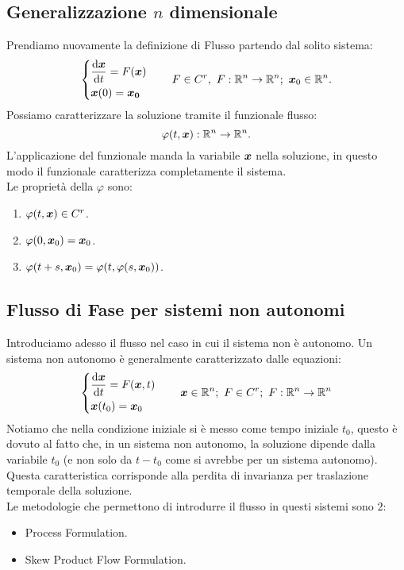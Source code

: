 \subsection{Generalizzazione $n$ dimensionale}%
\label{sub:Generalizzazione $n$ dimensonale}
Prendiamo nuovamente la definizione di Flusso partendo dal solito sistema:
\[
    \begin{dcases}
	\frac{\text{d} \boldsymbol{x}}{\text{d} t} = F(\boldsymbol{x})\\
	\boldsymbol{x} (0)=\boldsymbol{x_0}
    \end{dcases}
    \qquad 
    F \in C^r, \ F:\mathbb{R}^n\to \mathbb{R}^n; \ \boldsymbol{x}_0 \in \mathbb{R}^n
.\] 
Possiamo caratterizzare la soluzione tramite il funzionale flusso:
\[
    \varphi (t,\boldsymbol{x}): \mathbb{R}^n\to \mathbb{R}^n
.\] 
L'applicazione del funzionale manda la variabile $\boldsymbol{x}$ nella soluzione, in questo modo il funzionale caratterizza completamente il sistema.\\
Le proprietà della $\varphi$ sono:
\begin{enumerate}
    \item $\varphi (t, \boldsymbol{x}) \in C^r$.
    \item $\varphi (0, \boldsymbol{x}_0) = \boldsymbol{x}_0$.
    \item $\varphi (t + s, \boldsymbol{x}_0) = \varphi (t, \varphi (s, \boldsymbol{x}_0))$.
\end{enumerate}
\subsection{Flusso di Fase per sistemi non autonomi}%
\label{sub:Flusso di Fase per sistemi non autonomi}
Introduciamo adesso il flusso nel caso in cui il sistema non è autonomo. Un sistema non autonomo è generalmente caratterizzato dalle equazioni:
\[
    \begin{dcases}
	\frac{\text{d} \boldsymbol{x}}{\text{d} t} = F(\boldsymbol{x}, t)\\
	\boldsymbol{x}(t_0) = \boldsymbol{x}_0
    \end{dcases}
    \qquad 
    \boldsymbol{x} \in \mathbb{R}^n; \ F \in C^r; \ F: \mathbb{R}^n\to \mathbb{R}^n
\] 
Notiamo che nella condizione iniziale si è messo come tempo iniziale $t_0$, questo è dovuto al fatto che, in un sistema non autonomo, la soluzione dipende dalla variabile $t_0$ (e non solo da $t-t_0$ come si avrebbe per un sistema autonomo). Questa caratteristica corrisponde alla perdita di invarianza per traslazione temporale della soluzione.\\
Le metodologie che permettono di introdurre il flusso in questi sistemi sono $2$:
\begin{itemize}
    \item Process Formulation.
    \item Skew Product Flow Formulation.
\end{itemize}
